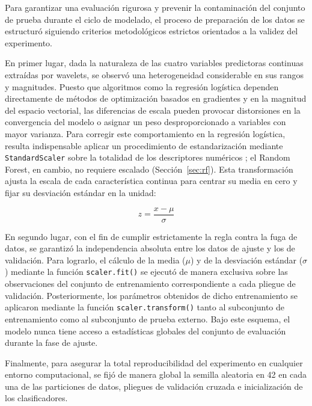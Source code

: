 \documentclass[conference]{IEEEtran}
\begin{document}
	Para garantizar una evaluación rigurosa y prevenir la contaminación del conjunto de prueba durante el ciclo de modelado, el proceso de preparación de los datos se estructuró siguiendo criterios metodológicos estrictos orientados a la validez del experimento.
	
	En primer lugar, dada la naturaleza de las cuatro variables predictoras continuas extraídas por wavelets, se observó una heterogeneidad considerable en sus rangos y magnitudes. Puesto que algoritmos como la regresión logística dependen directamente de métodos de optimización basados en gradientes y en la magnitud del espacio vectorial, las diferencias de escala pueden provocar distorsiones en la convergencia del modelo o asignar un peso desproporcionado a variables con mayor varianza. Para corregir este comportamiento en la regresión logística, resulta indispensable aplicar un procedimiento de estandarización mediante \texttt{StandardScaler} sobre la totalidad de los descriptores numéricos \cite{datacamp_zscore}; el Random Forest, en cambio, no requiere escalado (Sección~\ref{sec:rf}). Esta transformación ajusta la escala de cada característica continua para centrar su media en cero y fijar su desviación estándar en la unidad:
	
	\begin{equation}
		z = \frac{x - \mu}{\sigma}
	\end{equation}
	
	En segundo lugar, con el fin de cumplir estrictamente la regla contra la fuga de datos, se garantizó la independencia absoluta entre los datos de ajuste y los de validación. Para lograrlo, el cálculo de la media ($\mu$) y de la desviación estándar ($\sigma$) mediante la función \texttt{scaler.fit()} se ejecutó de manera exclusiva sobre las observaciones del conjunto de entrenamiento correspondiente a cada pliegue de validación. Posteriormente, los parámetros obtenidos de dicho entrenamiento se aplicaron mediante la función \texttt{scaler.transform()} tanto al subconjunto de entrenamiento como al subconjunto de prueba externo. Bajo este esquema, el modelo nunca tiene acceso a estadísticas globales del conjunto de evaluación durante la fase de ajuste.
	
	Finalmente, para asegurar la total reproducibilidad del experimento en cualquier entorno computacional, se fijó de manera global la semilla aleatoria en 42 en cada una de las particiones de datos, pliegues de validación cruzada e inicialización de los clasificadores.
\end{document}
